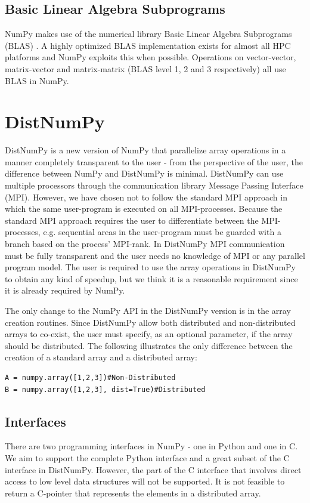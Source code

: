 \documentclass[10pt]{article}
\begin{document}
\subsection{Basic Linear Algebra Subprograms}
NumPy makes use of the numerical library Basic Linear Algebra Subprograms (BLAS) \cite{blas79}. A highly optimized BLAS implementation exists for almost all HPC platforms and NumPy exploits this when possible. Operations on vector-vector, matrix-vector and matrix-matrix (BLAS level 1, 2 and 3 respectively) all use BLAS in NumPy. 


\section{DistNumPy}
DistNumPy\cite{distnumpy09} is a new version of NumPy that parallelize array operations in a manner completely transparent to the user - from the perspective of the user, the difference between NumPy and DistNumPy is minimal. DistNumPy can use multiple processors through the communication library Message Passing Interface (MPI)\cite{mpi}. However, we have chosen not to follow the standard MPI approach in which the same user-program is executed on all MPI-processes. Because the standard MPI approach requires the user to differentiate between the MPI-processes, e.g. sequential areas in the user-program must be guarded with a branch based on the process' MPI-rank. In DistNumPy MPI communication must be fully transparent and the user needs no knowledge of MPI or any parallel program model. The user is required to use the array operations in DistNumPy to obtain any kind of speedup, but we think it is a reasonable requirement since it is already required by NumPy.

The only change to the NumPy API in the DistNumPy version is in the array creation routines. Since DistNumPy allow both distributed and non-distributed arrays to co-exist, the user must specify, as an optional parameter, if the array should be distributed. The following illustrates the only difference between the creation of a standard array and a distributed array:
\lstset{frame=none, xleftmargin=0mm, numbers=none}
\begin{lstlisting}
A = numpy.array([1,2,3])#Non-Distributed
B = numpy.array([1,2,3], dist=True)#Distributed
\end{lstlisting}
\lstset{frame=single, xleftmargin=5mm, numbers=left}


\subsection{Interfaces}
There are two programming interfaces in NumPy - one in Python and one in C. We aim to support the complete Python interface and a great subset of the C interface in DistNumPy. However, the part of the C interface that involves direct access to low level data structures will not be supported. It is not feasible to return a C-pointer that represents the elements in a distributed array.
\end{document}
